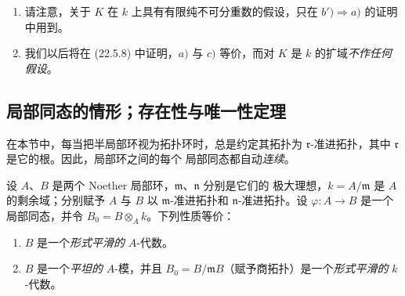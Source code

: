\begin{remarks}[19.6.7]
\label{0.19.6.7-fr}
\begin{enumerate}
  \item[\rm(i)] 请注意，关于 $K$ 在 $k$ 上具有有限纯不可分重数的假设，只在
  $b')\Rightarrow a)$ 的证明中用到。
  \item[\rm(ii)] 我们以后将在 (22.5.8) 中证明，$a)$ 与 $c)$ 等价，而对
  $K$ 是 $k$ 的扩域\emph{不作任何假设}。
\end{enumerate}
\end{remarks}

\subsection{局部同态的情形；存在性与唯一性定理}
\label{subsection:0.19.7-fr}

在本节中，每当把半局部环视为拓扑环时，总是约定其拓扑为
$\mathfrak r$-准进拓扑，其中 $\mathfrak r$ 是它的根。因此，局部环之间的每个
局部同态都自动\emph{连续}。

\begin{theorem}[19.7.1]
\label{0.19.7.1-fr}
设 $A$、$B$ 是两个 Noether 局部环，$\mathfrak m$、$\mathfrak n$ 分别是它们的
极大理想，$k=A/\mathfrak m$ 是 $A$ 的剩余域；分别赋予 $A$ 与 $B$ 以
$\mathfrak m$-准进拓扑和 $\mathfrak n$-准进拓扑。设
$\varphi:A\to B$ 是一个局部同态，并令 $B_0=B\otimes_A k$。下列性质等价：
\begin{enumerate}
  \item[a)] $B$ 是一个\emph{形式平滑的} $A$-代数。


  \item[b)] $B$ 是一个\emph{平坦的} $A$-模，并且
  $B_0=B/\mathfrak mB$（赋予商拓扑）是一个\emph{形式平滑的} $k$-代数。
\end{enumerate}
\end{theorem}


